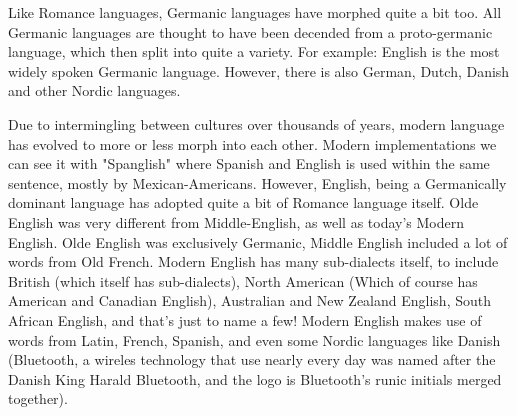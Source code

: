 \documentclass[12pt]{article}
\begin{document}
\par
Like Romance languages, Germanic languages have morphed quite a bit too. All Germanic languages are thought to have been decended from a proto-germanic language, which then split into quite a variety. For example: English is the most widely spoken Germanic language. However, there is also German, Dutch, Danish and other Nordic languages.
\par
Due to intermingling between cultures over thousands of years, modern language has evolved to more or less morph into each other. Modern implementations we can see it with "Spanglish" where Spanish and English is used within the same sentence, mostly by Mexican-Americans. However, English, being a Germanically dominant language has adopted quite a bit of Romance language itself. Olde English was very different from Middle-English, as well as today's Modern English. Olde English was exclusively Germanic, Middle English included a lot of words from Old French. Modern English has many sub-dialects itself, to include British (which itself has sub-dialects), North American (Which of course has American and Canadian English), Australian and New Zealand English, South African English, and that's just to name a few! Modern English makes use of words from Latin, French, Spanish, and even some Nordic languages like Danish (Bluetooth, a wireles technology that use nearly every day was named after the Danish King Harald Bluetooth, and the logo is Bluetooth's runic initials merged together).
\par
\par
\par
\end{document}
